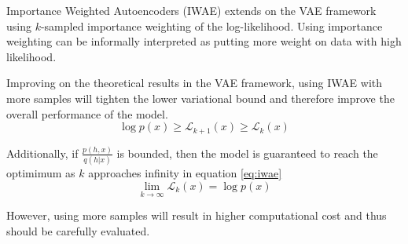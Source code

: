 

Importance Weighted Autoencoders (IWAE\cite{iwae:2015}) extends on the VAE framework using $k$-sampled importance weighting of the log-likelihood.
Using importance weighting can be informally interpreted as putting more weight on data with high likelihood.

Improving on the theoretical results in the VAE framework, using IWAE with more samples will tighten the lower variational bound and therefore improve the overall performance of the model.
\begin{equation*}
\log p(x) \geq \mathcal{L}_{k+1}(x) \geq \mathcal{L}_{k}(x)
\end{equation*}

Additionally, if $\frac{p(h,x)}{q(h|x)}$ is bounded, then the model is guaranteed to reach the optimimum as $k$ approaches infinity in equation \ref{eq:iwae}
\begin{equation}
\label{eq:iwae}
\lim_{k \rightarrow \infty} \mathcal{L}_{k}(x) = \log p(x)
\end{equation}

However, using more samples will result in higher computational cost and thus should be carefully evaluated.

